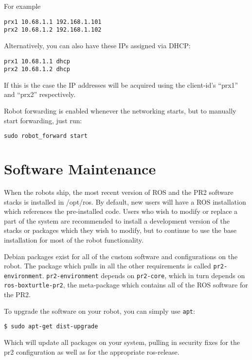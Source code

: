 For example

\begin{verbatim}
prx1 10.68.1.1 192.168.1.101
prx2 10.68.1.2 192.168.1.102
\end{verbatim}

Alternatively, you can also have these IPs assigned via DHCP:

\begin{verbatim}
prx1 10.68.1.1 dhcp
prx2 10.68.1.2 dhcp
\end{verbatim}

If this is the case the IP addresses will be acquired using the
client-id's ``prx1'' and ``prx2'' respectively.

Robot forwarding is enabled whenever the networking starts, but to
manually start forwarding, just run:

\begin{verbatim}
sudo robot_forward start
\end{verbatim}

\section{Software Maintenance}

When the robots ship, the most recent version of ROS and the PR2
software stacks is installed in /opt/ros.  By default, new users will
have a ROS installation which references the pre-installed code.
Users who wish to modify or replace a part of the system are
recommended to install a development version of the stacks or packages
which they wish to modify, but to continue to use the base
installation for most of the robot functionality.

Debian packages exist for all of the custom software and
configurations on the robot.  The package which pulls in all the other
requirements is called \texttt{pr2-environment}.
\texttt{pr2-environment} depends on \texttt{pr2-core}, which in turn
depends on \texttt{ros-boxturtle-pr2}, the meta-package which contains
all of the ROS software for the PR2.

To upgrade the software on your robot, you can simply use \texttt{apt}:

\begin{verbatim}
$ sudo apt-get dist-upgrade
\end{verbatim}

Which will update all packages on your system, pulling in security fixes for
the pr2 configuration as well as for the appropriate ros-release.


